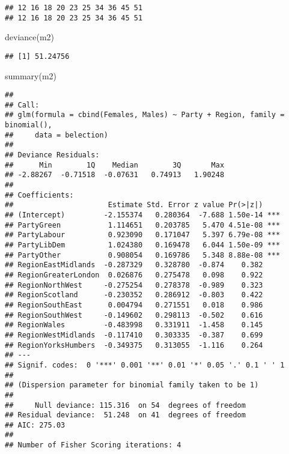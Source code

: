 \documentclass[
]{article}
\newenvironment{Shaded}{\begin{snugshade}}{\end{snugshade}}
\newcommand{\DecValTok}[1]{\textcolor[rgb]{0.00,0.00,0.81}{#1}}
\newcommand{\FunctionTok}[1]{\textcolor[rgb]{0.00,0.00,0.00}{#1}}
\newcommand{\NormalTok}[1]{#1}
\newcommand{\SpecialCharTok}[1]{\textcolor[rgb]{0.00,0.00,0.00}{#1}}
\begin{document}
\begin{Shaded}
\end{Shaded}

\begin{verbatim}
## 12 16 18 20 23 25 34 36 45 51 
## 12 16 18 20 23 25 34 36 45 51
\end{verbatim}

\begin{Shaded}
\begin{Highlighting}[]
\FunctionTok{deviance}\NormalTok{(m2)}
\end{Highlighting}
\end{Shaded}

\begin{verbatim}
## [1] 51.24756
\end{verbatim}

\begin{Shaded}
\begin{Highlighting}[]
\FunctionTok{summary}\NormalTok{(m2)}
\end{Highlighting}
\end{Shaded}

\begin{verbatim}
## 
## Call:
## glm(formula = cbind(Females, Males) ~ Party + Region, family = binomial(), 
##     data = belection)
## 
## Deviance Residuals: 
##      Min        1Q    Median        3Q       Max  
## -2.88267  -0.71518  -0.07631   0.74913   1.90248  
## 
## Coefficients:
##                      Estimate Std. Error z value Pr(>|z|)    
## (Intercept)         -2.155374   0.280364  -7.688 1.50e-14 ***
## PartyGreen           1.114651   0.203785   5.470 4.51e-08 ***
## PartyLabour          0.923090   0.171047   5.397 6.79e-08 ***
## PartyLibDem          1.024380   0.169478   6.044 1.50e-09 ***
## PartyOther           0.908054   0.169786   5.348 8.88e-08 ***
## RegionEastMidlands  -0.287329   0.328780  -0.874    0.382    
## RegionGreaterLondon  0.026876   0.275478   0.098    0.922    
## RegionNorthWest     -0.275254   0.278378  -0.989    0.323    
## RegionScotland      -0.230352   0.286912  -0.803    0.422    
## RegionSouthEast      0.004794   0.271551   0.018    0.986    
## RegionSouthWest     -0.149602   0.298113  -0.502    0.616    
## RegionWales         -0.483998   0.331911  -1.458    0.145    
## RegionWestMidlands  -0.117410   0.303335  -0.387    0.699    
## RegionYorksHumbers  -0.349375   0.313055  -1.116    0.264    
## ---
## Signif. codes:  0 '***' 0.001 '**' 0.01 '*' 0.05 '.' 0.1 ' ' 1
## 
## (Dispersion parameter for binomial family taken to be 1)
## 
##     Null deviance: 115.316  on 54  degrees of freedom
## Residual deviance:  51.248  on 41  degrees of freedom
## AIC: 275.03
## 
## Number of Fisher Scoring iterations: 4
\end{verbatim}
\end{document}
